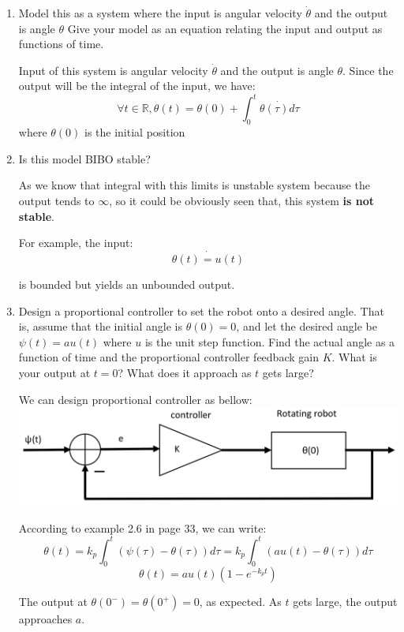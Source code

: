 \documentclass[12pt]{article}
\begin{document}
\begin{enumerate}
	\item Model this as a system where the input is angular velocity $\dot{\theta}$ and the output is angle $\theta$ Give your model as an equation relating the input and output as functions of time.
	\begin{qsolve}[Solution]
		Input of this system is angular velocity $\dot{\theta}$ and the output is angle $\theta$. Since the output will be the integral of the input, we have:
		$$ \forall t \in \mathbb{R}, \theta(t)=\theta(0)+\int_{0}^{t}\dot{\theta(\tau)d\tau} $$
		where $\theta(0)$ is the initial position
		
	\end{qsolve}
	
	
	
	
	\item Is this model BIBO stable?
	\begin{qsolve}[Solution]
		As we know that integral with this limits is unstable system because the output tends to $\infty$, so it could be obviously seen that, this
		system \textbf{is not stable}.
		
		For example, the input:
		$$ \dot{\theta(t)=u(t)} $$
		
		is bounded but yields an unbounded output.
	\end{qsolve}
	
	
	
	
	
	\item Design a proportional controller to set the robot onto a desired angle. That is, assume that the initial angle is $\theta(0)=0$, and let the desired angle be $\psi(t)=au(t)$ where $u$ is the unit step function. Find the actual angle as a function of time and the proportional controller feedback gain $K$. What is your output at $t=0$? What does it approach as $t$ gets large?
	\begin{qsolve}[Solution]
		We can design proportional controller as bellow:\\
		
		
		
		
		\centering\includegraphics*[width=0.6\linewidth]{images/img2}
		

		
		\raggedright According to example 2.6 in page 33, we can write:
		$$ \theta(t)=k_p\int_{0}^{t}(\psi(\tau)-\theta(\tau))d\tau=k_p\int_{0}^{t}(au(t)-\theta(\tau))d\tau $$
		$$ \theta(t)=au(t)(1-e^{-k_pt}) $$
		
		The output at $\theta(0^-)=\theta(0^+)=0$, as expected. As $t$ gets large, the output approaches $a$.
		
	\end{qsolve}
\end{enumerate}
\end{document}
